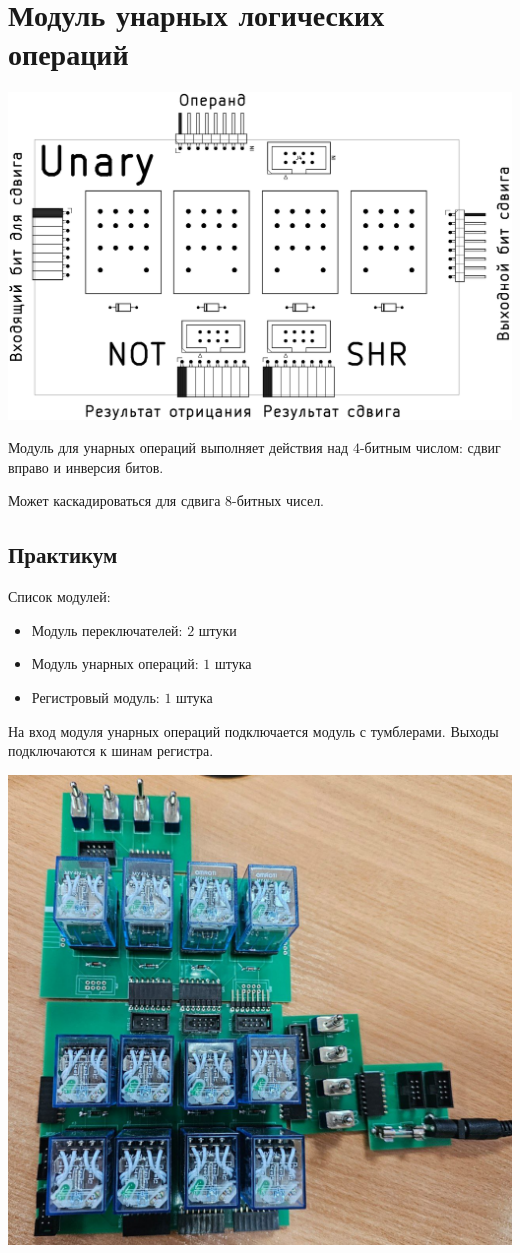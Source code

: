\section{Модуль унарных логических операций}

\begin{center}
\includegraphics{boards/logic_unary.png}
\end{center}

Модуль для унарных операций выполняет действия над $4$-битным числом: сдвиг вправо и инверсия битов.

Может каскадироваться для сдвига $8$-битных чисел.

\subsection{Практикум}


Список модулей:
\begin{itemize}
    \item Модуль переключателей: $2$ штуки
    \item Модуль унарных операций: $1$ штука
    \item Регистровый модуль: $1$ штука
\end{itemize}


На вход модуля унарных операций подключается модуль с тумблерами.
Выходы подключаются к шинам регистра.


\includegraphics[width=0.5\columnwidth]{photo/unary.jpg}

